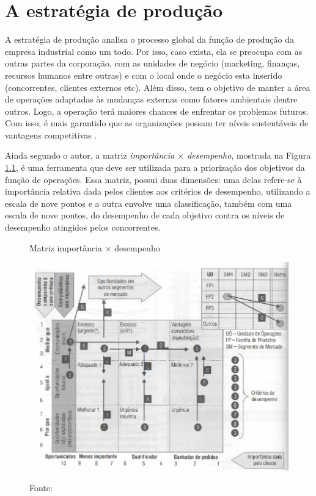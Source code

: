 \chapter{A estratégia de produção}
\label{chap:estrategia_da_producao}

A estratégia de produção analisa o processo global da função de produção da empresa industrial como um todo. Por isso, caso exista, ela se preocupa com as outras partes da corporação, com as unidades de negócio (marketing, finanças, recursos humanos entre outras) e com o local onde o negócio esta inserido (concorrentes, clientes externos etc). Além disso, tem o objetivo de manter a área de operações adaptadas às mudanças externas como fatores ambientais dentre outros. Logo, a operação terá maiores chances de enfrentar os problemas futuros. Com isso, é mais garantido que as organizações possam ter níveis sustentáveis de vantagens competitivas \cite{correa2000administracao}.

Ainda segundo o autor, a matriz \textit{importância $\times$ desempenho}, mostrada na Figura \ref{fig:matriz_importancia_desempenho}, é uma ferramenta que deve ser utilizada para a priorização dos objetivos da função de operações. Essa matriz, possui duas dimensões: uma delas refere-se à importância relativa dada pelos clientes aos critérios de desempenho, utilizando a escala de nove pontos e a outra envolve uma classificação, também com uma escala de nove pontos, do desempenho de cada objetivo contra os níveis de desempenho atingidos pelos concorrentes.

\begin{figure}[H]
  \caption{Matriz importância $\times$ desempenho}
  \includegraphics[width =1\textwidth]{images/impor_desem.png}
  \label{fig:matriz_importancia_desempenho}
  \caption*{Fonte: \cite{correa2000administracao}}
\end{figure}

